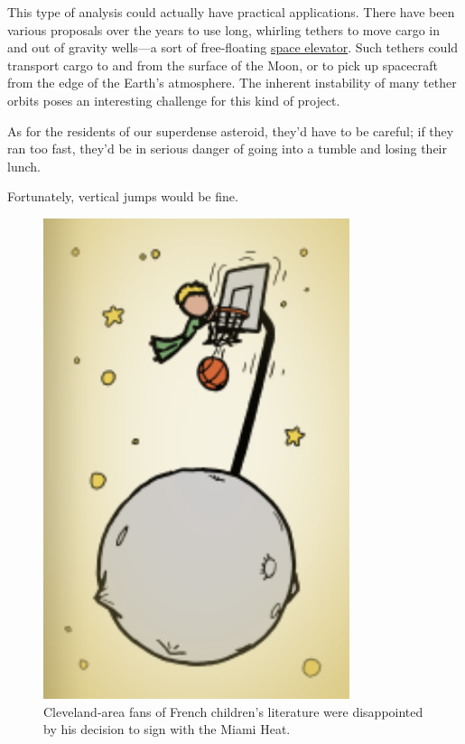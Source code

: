 {{This type of analysis could actually have practical applications. There have been various proposals over the years to use long, whirling tethers to move cargo in and out of gravity wells—a sort of free-floating \href{https://en.wikipedia.org/wiki/Space\_elevator}{space elevator}. Such tethers could transport cargo to and from the surface of the Moon, or to pick up spacecraft from the edge of the Earth's atmosphere. The inherent instability of many tether orbits poses an interesting challenge for this kind of project.}

{As for the residents of our superdense asteroid, they'd have to be careful; if they ran too fast, they'd be in serious danger of going into a tumble and losing their lunch.}

{Fortunately, vertical jumps would be fine.}

\begin{figure}[!htbp]
\centering
\includegraphics[scale=0.5, max width=0.8\textwidth]{imgs/a/68/asteroid_dunk.png}
\caption{Cleveland-area fans of French children's literature were disappointed by his decision to sign with the Miami Heat.}
\end{figure}

}
